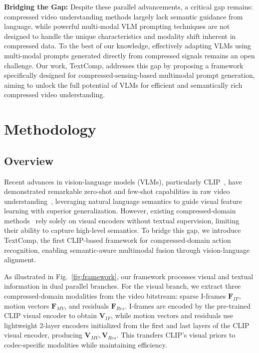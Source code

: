 \documentclass[letterpaper]{article} %
\newcommand{\methodname}{TextComp}
\begin{document}
\textbf{Bridging the Gap:} Despite these parallel advancements, a critical gap remains: compressed video understanding methods largely lack semantic guidance from language, while powerful multi-modal VLM prompting techniques are not designed to handle the unique characteristics and modality shift inherent in compressed data. To the best of our knowledge, effectively adapting VLMs using multi-modal prompts generated directly from compressed signals remains an open challenge. Our work, \methodname, addresses this gap by proposing a framework specifically designed for compressed-sensing-based multimodal prompt  generation, aiming to unlock the full potential of VLMs for efficient and semantically rich compressed video understanding.

\section{Methodology}
\label{sec:method}

\subsection{Overview}
\label{sec:baseline}

Recent advances in vision-language models (VLMs), particularly CLIP~\cite{radford2021learning}, have demonstrated remarkable zero-shot and few-shot capabilities in raw video understanding~\cite{wang2021actionclipnewparadigmvideo,ni2022expanding}, leveraging natural language semantics to guide visual feature learning with superior generalization. However, existing compressed-domain methods~\cite{li2023compressed,CFM-Net-li2025interactive} rely solely on visual encoders without textual supervision, limiting their ability to capture high-level semantics. To bridge this gap, we introduce TextComp, the first CLIP-based framework for compressed-domain action recognition, enabling semantic-aware multimodal fusion through vision-language alignment.

As illustrated in Fig.~\ref{fig:framework}, our framework processes visual and textual information in dual parallel branches. For the visual branch, we extract three compressed-domain modalities from the video bitstream: sparse I-frames $\mathbf{F}_{IF}$, motion vectors $\mathbf{F}_{MV}$, and residuals $\mathbf{F}_{Res}$. I-frames are encoded by the pre-trained CLIP visual encoder to obtain $\mathbf{V}_{IF}$, while motion vectors and residuals use lightweight 2-layer encoders initialized from the first and last layers of the CLIP visual encoder, producing $\mathbf{V}_{MV}, \mathbf{V}_{Res}$. This transfers CLIP's visual priors to codec-specific modalities while maintaining efficiency.
\end{document}
